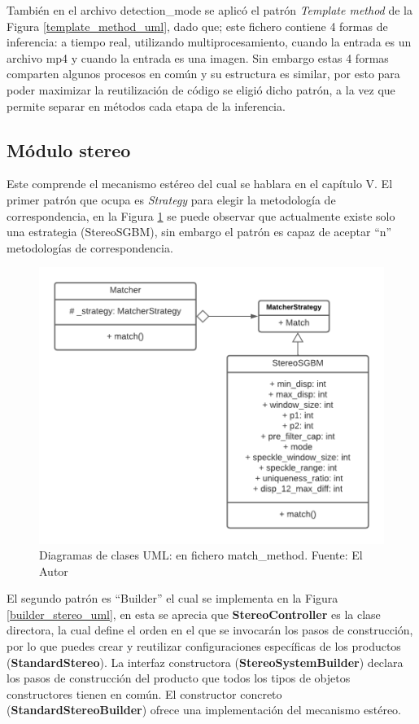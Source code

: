 También en el archivo detection\_mode se aplicó el patrón \textit{Template method} de la Figura \ref{template_method_uml}, dado que; este fichero contiene 4 formas de inferencia: a tiempo real, utilizando multiprocesamiento, cuando la entrada es un archivo mp4 y cuando la entrada es una imagen. Sin embargo estas 4 formas comparten algunos procesos en común y su estructura es similar, por esto para poder maximizar la reutilización de código se eligió dicho patrón, a la vez que permite separar en métodos cada etapa de la inferencia.
\subsection{Módulo stereo}
Este comprende el mecanismo estéreo del cual se hablara en el capítulo V. El primer patrón que ocupa es \textit{Strategy} para elegir la metodología de correspondencia, en la Figura \ref{strategy_matcher_uml} se puede observar que actualmente existe solo una estrategia (StereoSGBM), sin embargo el patrón es capaz de aceptar ``n'' metodologías de correspondencia. 
\begin{figure}[H]
    \centering
    \includegraphics[scale=0.5]{Recursos/strategy_matcher_uml.png}
    \caption[Diagramas de clases UML: en fichero match\_method.]{Diagramas de clases UML: en fichero match\_method. {\footnotesize Fuente: El Autor}}
    \label{strategy_matcher_uml}
\end{figure}
El segundo patrón es ``Builder'' el cual se implementa en la Figura \ref{builder_stereo_uml}, en esta se aprecia que \textbf{StereoController} es la clase directora, la cual define el orden en el que se invocarán los pasos de construcción, por lo que puedes crear y reutilizar configuraciones específicas de los productos (\textbf{StandardStereo}). La interfaz constructora (\textbf{StereoSystemBuilder}) declara los pasos de construcción del producto que todos los tipos de objetos constructores tienen en común. El constructor concreto (\textbf{StandardStereoBuilder}) ofrece una implementación del mecanismo estéreo.
